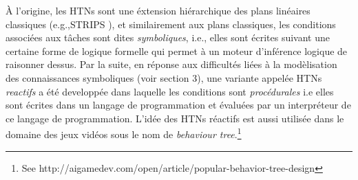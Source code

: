 \documentclass[a4paper,twoside,french]{article}
\begin{document}
				\`A l'origine, les HTNs sont une \'extension hi\'erarchique des plans lin\'eaires classiques (e.g.,STRIPS ), et similairement aux plans classiques, les conditions associ\'ees aux t\^aches sont dites \textit{symboliques}, i.e., elles sont \'ecrites suivant une certaine forme de logique formelle qui permet à un moteur d'inf\'erence logique de raisonner dessus. Par la suite, en r\'eponse aux difficult\'es li\'ees \`a la mod\`elisation des connaissances symboliques (voir section 3), une variante appel\'ee HTNs \textit{reactifs} a \'et\'e developp\'ee dans laquelle les conditions sont \textit{proc\'edurales} i.e elles sont \'ecrites dans un langage de programmation et \'evalu\'ees par un interpr\'eteur de ce langage de programmation. L'id\'ee des HTNs réactifs est aussi utilis\'ee dans le domaine des jeux vid\'eos sous le nom de \emph{behaviour tree}.\footnote{See http://aigamedev.com/open/article/popular-behavior-tree-design}
				
\end{document}
